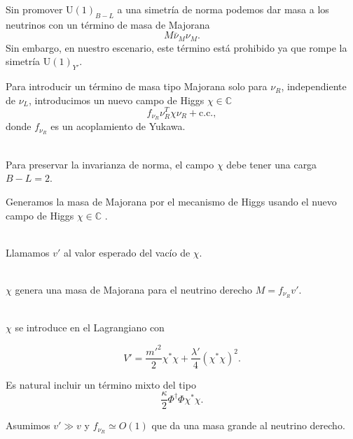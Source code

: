 \documentclass[14pt]{beamer}
\begin{document}
\begin{frame}
Sin promover U$(1)_{B-L}$ a una simetría de norma podemos dar masa a los neutrinos con un término de masa de Majorana
$$	M\bar{\nu}_M \nu_M. $$
Sin embargo, en nuestro escenario, este término está prohibido ya que rompe la simetría U$(1)_{Y'}$.
\end{frame}


\begin{frame}
Para introducir un término de masa tipo Majorana solo para $\nu_R$, independiente de $\nu_L$, introducimos un nuevo campo de Higgs $\chi\in\mathbb{C}$
$$f_{\nu_R} \nu_R^T \chi \nu_R + \text{c.c.},$$
donde $f_{\nu_R}$ es un acoplamiento de Yukawa. \\~\

Para preservar la invarianza de norma, el campo $\chi$ debe tener una carga $B-L=2$.
\end{frame}

\begin{frame}
Generamos la masa de Majorana por el mecanismo de Higgs usando el nuevo campo de Higgs $\chi \in \mathbb{C}$ .\\~\

Llamamos $v'$ al valor esperado del vacío de $\chi$. \\~\

$\chi$ genera una masa de Majorana para el neutrino derecho $M = f_{\nu_R} v'$.  \\~\

\end{frame}

\begin{frame}

$\chi$ se introduce en el Lagrangiano con

$$V' = \frac{m'^{2}}{2}\chi^*\chi+\frac{\lambda'}{4}(\chi^*\chi)^2.$$ 

Es natural incluir un término mixto del tipo 
$$ \frac{\kappa}{2}\Phi^{\dagger}\Phi\chi^*\chi.$$

Asumimos  $v'\gg v$ y $f_{\nu_R}\simeq O(1)$ que da una masa grande al neutrino derecho.
\end{frame}
\end{document}
